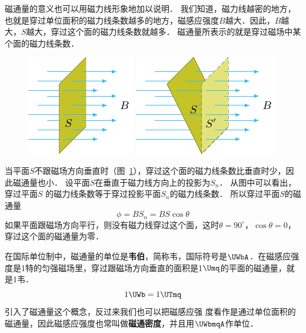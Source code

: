 磁通量的意义也可以用磁力线形象地加以说明．
我们知道，磁力线越密的地方，也就是穿过单位面积的磁力线条数越多的地方，磁感应强度$B$越大．因此，$B$越大，$S$越大，穿过这个面的磁力线条数就越多．
磁通量所表示的就是穿过磁场中某个面的磁力线条数．

\begin{figure}[htbp]
    \centering
    \begin{minipage}[t]{0.48\textwidth}
        \centering
        \includegraphics{fig/C/1-17.pdf}
        \caption{}\label{fig_C_1-17}
    \end{minipage}
    \begin{minipage}[t]{0.48\textwidth}
        \centering
        \includegraphics{fig/C/1-18.pdf}
        \caption{}\label{fig_C_1-18}
    \end{minipage}
\end{figure}


当平面$S$不跟磁场方向垂直时（图~\ref{fig_C_1-18}），穿过这个面的磁力线条数比垂直时少，因此磁通量也小．
设平面$S$在垂直于磁力线方向上的投影为$S_n$．
从图中可以看出，穿过平面$S$
的磁力线条数等于穿过投影平面$S_n$的磁力线条数．
所以穿过平面$S$的磁通量
\[\phi=BS_n=BS\cos\theta\]
如果平面跟磁场方向平行，则没有磁力线穿过这个面，这时$\theta=90^\circ$，$\cos\theta=0$，穿过这个面的磁通量为零．

在国际单位制中，磁通量的单位是\textbf{韦伯}，简称韦，国际符号是$\UWbA$．在磁感应强度是1特的匀强磁场里，穿过跟磁场方向垂直的面积是1$\Umq$的平面的磁通量，就是1韦．
\[1 \UWb =1 \UTmq\]
引入了磁通量这个概念，反过来我们也可以把磁感应强
度看作是通过单位面积的磁通量，因此磁感应强度也常叫做\textbf{磁通密度}，并且用$\UWbmqA$作单位．

